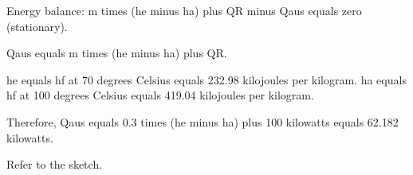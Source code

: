 Energy balance:  
m times (he minus ha) plus QR minus Qaus equals zero (stationary).  

Qaus equals m times (he minus ha) plus QR.  

he equals hf at 70 degrees Celsius equals 232.98 kilojoules per kilogram.  
ha equals hf at 100 degrees Celsius equals 419.04 kilojoules per kilogram.  

Therefore, Qaus equals 0.3 times (he minus ha) plus 100 kilowatts equals 62.182 kilowatts.  

Refer to the sketch.